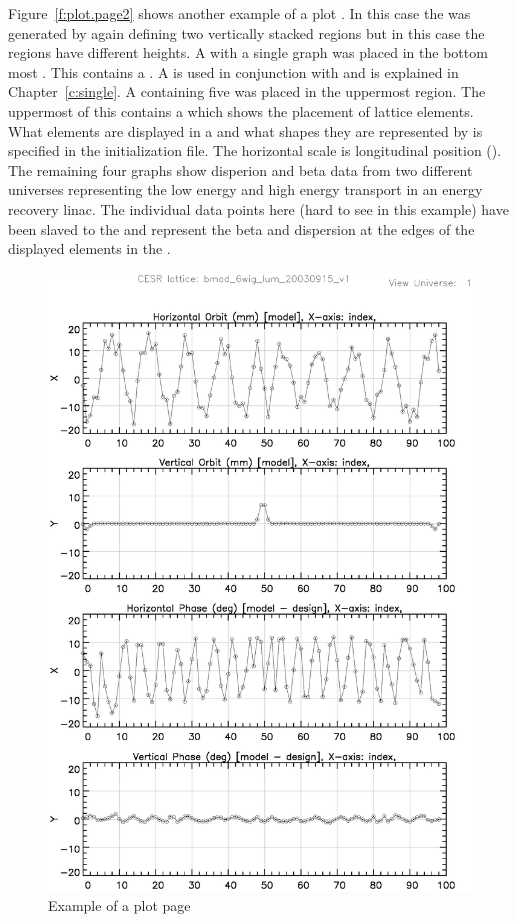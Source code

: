 Figure~\ref{f:plot.page2} shows another example of a plot .
In this case the  was generated by again defining two
vertically stacked regions but in this case the regions have different
heights.  A  with a single graph was placed in the
bottom most .  This  contains a .
A  is used in conjunction with  and is
explained in Chapter~\ref{c:single}. A  containing
five  was placed in the uppermost region. The uppermost
 of this  contains a  which
shows the placement of lattice elements.  What elements are displayed
in a  and what shapes they are represented by is
specified in the initialization file. The horizontal scale is
longitudinal position ().  The remaining four graphs show
disperion and beta data from two different universes representing the
low energy and high energy transport in an energy recovery linac. The
individual data points here (hard to see in this example) have been
slaved to the  and represent the beta and dispersion at
the edges of the displayed elements in the .


\begin{figure}
  \centering
  \includegraphics[width=5in]{plot-page1.eps}
  \caption{Example of a plot page}
  \label{f:plot.page1}
\end{figure}

